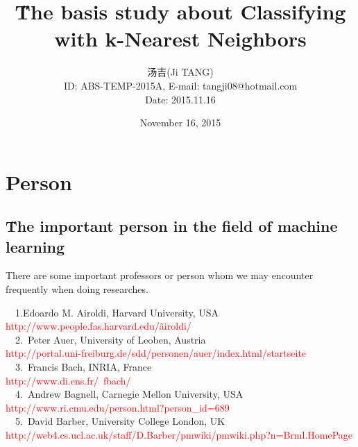 \documentclass[a4paper,12pt,oneside]{book}
\title{{\H The basis study about Classifying with k-Nearest Neighbors}\quad {ABS-TEMP-2015A-No.002-TJx}}
\author{汤吉(Ji TANG)\\
               ID: ABS-TEMP-2015A,  E-mail: tangji08@hotmail.com \\
        Date: 2015.11.16}
\date{November 16, 2015}
\newcommand{\red}[1]{  \textcolor{red}  {#1}}   %
\begin{document}
  
\maketitle
\pagestyle{fancy}
\fancyhead[LO,RE]{\leftmark} %



\renewcommand{\headrulewidth}{0.4pt}
\renewcommand{\footrulewidth}{0.4pt}


\clearpage{\pagestyle{empty}\cleardoublepage}

\tableofcontents 
\newpage
\clearpage{\pagestyle{empty}\cleardoublepage}
\chapter{Person}
\section{\H The important person in the field of machine learning}
There are some important professors or person whom we may encounter frequently when doing researches.

\noindent ~~1.Edoardo M. Airoldi, Harvard University, USA\\
\indent\red{http://www.people.fas.harvard.edu/\~airoldi/}\\

\noindent ~~2.~Peter Auer, University of Leoben, Austria\\
\indent\red{http://portal.uni-freiburg.de/sdd/personen/auer/index.html/startseite}\\

\noindent ~~3.~Francis Bach, INRIA, France\\
\indent\red{http://www.di.ens.fr/~fbach/}\\

\noindent ~~4.~Andrew Bagnell, Carnegie Mellon University, USA\\
\indent\red{http://www.ri.cmu.edu/person.html?person\_id=689}\\

\noindent ~~5.~David Barber, University College London, UK\\
\indent\red{http://web4.cs.ucl.ac.uk/staff/D.Barber/pmwiki/pmwiki.php?n=Brml.HomePage}\\
\end{document}
